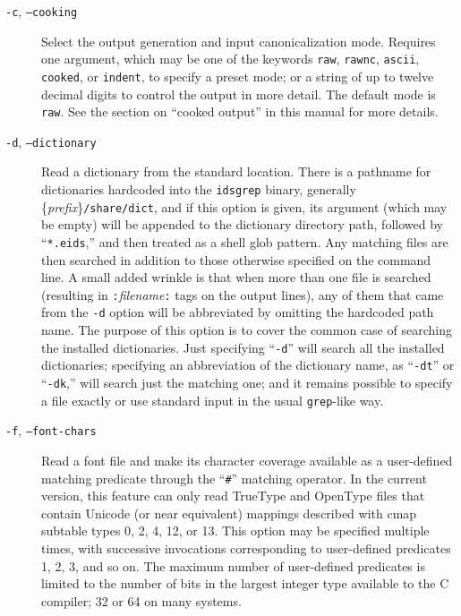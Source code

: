 \documentclass[twocolumn]{report}
\begin{document}
\begin{description}

\item[\texttt{-c}, \texttt{--cooking}]
Select the output generation and input canonicalization mode.  Requires one
argument, which may be one of the keywords \texttt{raw}, \texttt{rawnc},
\texttt{ascii}, \texttt{cooked}, or \texttt{indent}, to specify a preset
mode; or a string of up to twelve decimal digits to control the output in
more detail.  The default mode is \texttt{raw}.  See the
section on ``cooked output'' in this manual for more details.

\item[\texttt{-d}, \texttt{--dictionary}]
Read a dictionary
from the standard location.  There is a pathname for dictionaries hardcoded
into the \texttt{idsgrep} binary, generally
\{\emph{prefix}\}\texttt{/share/dict}, and if this option is given, its
argument (which may be empty) will be appended to the dictionary directory
path, followed by ``\texttt{*.eids},'' and then treated as a shell glob
pattern.  Any matching files are then searched in addition to those
otherwise specified on the command line.  A small added wrinkle is that when
more than one file is searched (resulting in
\texttt{:}\textit{filename}\texttt{:} tags on the output lines), any of them
that came from the \texttt{-d} option will be abbreviated by omitting the
hardcoded path name.  The purpose of this option is to cover the common case
of searching the installed dictionaries.  Just specifying ``\texttt{-d}''
will search all the installed dictionaries; specifying an abbreviation of
the dictionary name, as ``\texttt{-dt}'' or ``\texttt{-dk},'' will search
just the matching one; and it remains possible to specify a file exactly or
use standard input in the usual \texttt{grep}-like way.

\item[\texttt{-f}, \texttt{--font-chars}]
Read a font file and make its character coverage available as a user-defined
matching predicate through the ``\texttt{\#}'' matching operator.  In the
current version, this feature can only read TrueType and OpenType files that
contain Unicode (or near equivalent) mappings described with cmap subtable
types 0, 2, 4, 12, or 13.  This option may be specified multiple times, with
successive invocations corresponding to user-defined predicates 1, 2, 3, and
so on.  The maximum number of user-defined predicates is limited to the
number of bits in the largest integer type available to the C compiler; 32
or 64 on many systems.


\end{description}
\end{document}
